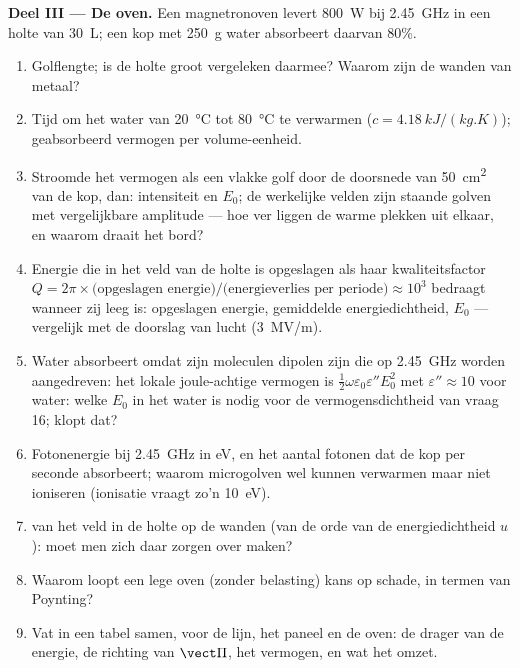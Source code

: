 \begin{problem}
\medskip
\noindent\textbf{Deel III --- De oven.}
Een magnetronoven levert \qty{800}{W} bij \qty{2.45}{GHz} in een holte van
\qty{30}{L}; een kop met \qty{250}{g} water absorbeert daarvan $80\%$.
\begin{enumerate}[resume]
  \item Golflengte; is de holte groot vergeleken daarmee? Waarom zijn de
        wanden van metaal?
  \item Tijd om het water van \qty{20}{\degreeCelsius} tot
        \qty{80}{\degreeCelsius} te verwarmen ($c = \qty{4.18}{kJ/(kg.K)}$);
        geabsorbeerd vermogen per volume-eenheid.
  \item Stroomde het vermogen als een vlakke golf door de doorsnede van
        \qty{50}{cm^2} van de kop, dan: intensiteit en $E_0$; de werkelijke
        velden zijn staande golven met vergelijkbare amplitude --- hoe ver
        liggen de warme plekken uit elkaar, en waarom draait het bord?
  \item Energie die in het veld van de holte is opgeslagen als haar
        kwaliteitsfactor
        $Q = 2\pi\times\text{(opgeslagen energie)}/\text{(energieverlies per periode)}
        \approx 10^3$
        bedraagt wanneer zij leeg is: opgeslagen energie, gemiddelde
        energiedichtheid, $E_0$ --- vergelijk met de doorslag van lucht
        (\qty{3}{MV/m}).
  \item Water absorbeert omdat zijn moleculen dipolen zijn die op
        \qty{2.45}{GHz} worden aangedreven: het lokale joule-achtige
        vermogen is $\tfrac12\omega\varepsilon_0
        \varepsilon''E_0^2$ met
        $\varepsilon'' \approx 10$ voor water: welke $E_0$ in het water is
        nodig voor de vermogensdichtheid van vraag 16; klopt dat?
  \item Fotonenergie bij \qty{2.45}{GHz} in eV, en het aantal fotonen dat de
        kop per seconde absorbeert; waarom microgolven wel kunnen verwarmen
        maar niet ioniseren (ionisatie vraagt zo'n \qty{10}{eV}).
  \item {} van het veld in de holte op de wanden (van de orde van
        de energiedichtheid $u$): moet men zich daar zorgen over maken?
  \item Waarom loopt een lege oven (zonder belasting) kans op schade, in
        termen van Poynting?
  \item Vat in een tabel samen, voor de lijn, het paneel en de oven: de
        drager van de energie, de richting van $\vect\Pi$, het vermogen, en
        wat het omzet.
\end{enumerate}
\end{problem}
